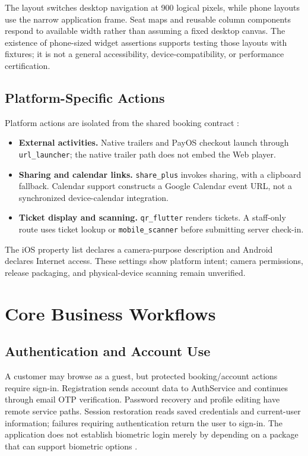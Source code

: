 \documentclass[conference]{IEEEtran}
\newenvironment{keypoints}{\begin{itemize}\setlength{\itemsep}{2pt}%
\setlength{\parsep}{0pt}}{\end{itemize}}
\newcommand{\code}[1]{\texttt{#1}}
\begin{document}
The layout switches desktop navigation at 900 logical pixels, while phone
layouts use the narrow application frame. Seat maps and reusable column
components respond to available width rather than assuming a fixed desktop
canvas. The existence of phone-sized widget assertions supports testing those
layouts with fixtures; it is not a general accessibility, device-compatibility,
or performance certification.

\subsection{Platform-Specific Actions}
Platform actions are isolated from the shared booking contract \cite{client}:
\begin{keypoints}
\item \textbf{External activities.} Native trailers and PayOS checkout launch
through \code{url\_launcher}; the native trailer path does not embed the Web player.
\item \textbf{Sharing and calendar links.} \code{share\_plus} invokes sharing,
with a clipboard fallback. Calendar support constructs a Google Calendar event URL,
not a synchronized device-calendar integration.
\item \textbf{Ticket display and scanning.} \code{qr\_flutter} renders tickets.
A staff-only route uses ticket lookup or \code{mobile\_scanner} before submitting
server check-in.
\end{keypoints}
The iOS property list declares a camera-purpose description and Android declares
Internet access. These settings show platform intent; camera permissions,
release packaging, and physical-device scanning remain unverified.

\section{Core Business Workflows}
\subsection{Authentication and Account Use}
A customer may browse as a guest, but protected booking/account actions require
sign-in. Registration sends account data to AuthService and continues through
email OTP verification. Password recovery and profile editing have remote
service paths. Session restoration reads saved credentials and current-user
information; failures requiring authentication return the user to sign-in.
The application does not establish biometric login merely by depending on a
package that can support biometric options \cite{client,auth}.
\end{document}
